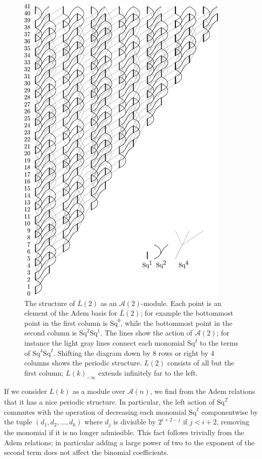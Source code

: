 \documentclass{article}
\newcommand{\A}{\mathcal{A}}
\newcommand{\Sq}{\mathrm{Sq}}
\renewcommand{\L}{\bar{L}}
\newcommand{\Lkm}[1][k]{L{(#1)}_{-\infty}}
\begin{document}
\begin{figure}
  \includegraphics[width=0.9\textwidth]{pics/L2-paper.pdf}
  \caption{The structure of $\L(2)$ as an $\A(2)$-module.  Each point is an element of the Adem basis for $\L(2)$; for example the bottommost point in the first column is $\Sq^0$, while the bottommost point in the second column is $\Sq^2\Sq^1$.  The lines show the action of $\A(2)$; for instance the light gray lines connect each monomial $\Sq^I$ to the terms of $\Sq^4\Sq^I$.  Shifting the diagram down by 8 rows or right by 4 columns shows the periodic structure.  $L(2)$ consists of all but the first column; $\Lkm$ extends infinitely far to the left.\label{fig:L2}}
\end{figure}

If we consider $L(k)$ as a module over $\A(n)$, we find from the Adem relations that it has a nice periodic structure.  In particular, the left action of $\Sq^{2^i}$ commutes with the operation of decreasing each monomial $\Sq^I$ componentwise by the tuple $(d_1, d_2, \ldots, d_k)$ where $d_j$ is divisible by $2^{i+2-j}$ if $j<i+2$, removing the monomial if it is no longer admissible.  This fact follows trivially from the Adem relations; in particular adding a large power of two to the exponent of the second term does not affect the binomial coefficients.
\end{document}
